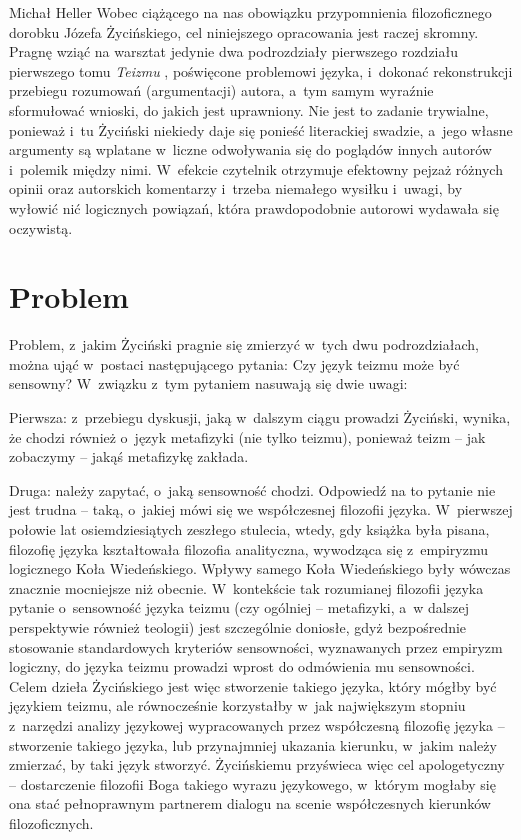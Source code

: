 \begin{artplenv}{Michał Heller}
Wobec ciążącego na nas obowiązku przypomnienia filozoficznego dorobku Józefa Życińskiego, cel niniejszego opracowania jest raczej skromny. Pragnę wziąć na warsztat jedynie dwa podrozdziały pierwszego rozdziału pierwszego tomu \textit{Teizmu}
\parencite[][s.~13–36]{zycinski_teizm_1985}, %
 poświęcone problemowi języka, i~dokonać rekonstrukcji przebiegu rozumowań (argumentacji) autora, a~tym samym wyraźnie sformułować wnioski, do jakich jest uprawniony. Nie jest to zadanie trywialne, ponieważ i~tu Życiński niekiedy daje się ponieść literackiej swadzie, a~jego własne argumenty są wplatane w~liczne odwoływania się do poglądów innych autorów i~polemik między nimi. W~efekcie czytelnik otrzymuje efektowny pejzaż różnych opinii oraz autorskich komentarzy i~trzeba niemałego wysiłku i~uwagi, by wyłowić nić logicznych powiązań, która prawdopodobnie autorowi wydawała się oczywistą.
 \enlargethispage{1.5\baselineskip}

\section{Problem}
Problem, z~jakim Życiński pragnie się zmierzyć w~tych dwu podrozdziałach, można ująć w~postaci następującego pytania: Czy język teizmu może być sensowny? W~związku z~tym pytaniem nasuwają się dwie uwagi:

Pierwsza: z~przebiegu dyskusji, jaką w~dalszym ciągu prowadzi Życiński, wynika, że chodzi również o~język metafizyki (nie tylko teizmu), ponieważ teizm -- jak zobaczymy -- jakąś metafizykę zakłada.

Druga: należy zapytać, o~jaką sensowność chodzi. Odpowiedź na to pytanie nie jest trudna -- taką, o~jakiej mówi się we współczesnej filozofii języka. W~pierwszej połowie lat osiemdziesiątych zeszłego stulecia, wtedy, gdy książka była pisana, filozofię języka kształtowała filozofia analityczna, wywodząca się z~empiryzmu logicznego Koła Wiedeńskiego. Wpływy samego Koła Wiedeńskiego były wówczas znacznie mocniejsze niż obecnie. W~kontekście tak rozumianej filozofii języka pytanie o~sensowność języka teizmu (czy ogólniej -- metafizyki, a~w dalszej perspektywie również teologii) jest szczególnie doniosłe, gdyż bezpośrednie stosowanie standardowych kryteriów sensowności, wyznawanych przez empiryzm logiczny, do języka teizmu prowadzi wprost do odmówienia mu sensowności. Celem dzieła Życińskiego jest więc stworzenie takiego języka, który mógłby być językiem teizmu, ale równocześnie korzystałby w~jak największym stopniu z~narzędzi analizy językowej wypracowanych przez współczesną filozofię języka -- stworzenie takiego języka, lub przynajmniej ukazania kierunku, w~jakim należy zmierzać, by taki język stworzyć. Życińskiemu przyświeca więc cel apologetyczny -- dostarczenie filozofii Boga takiego wyrazu językowego, w~którym mogłaby się ona stać pełnoprawnym partnerem dialogu na scenie współczesnych kierunków filozoficznych.


\end{artplenv}
